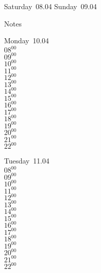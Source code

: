 \documentclass[11pt,a4paper]{book}\usepackage[]{graphicx}\usepackage[]{color}
\begin{document}
\begin{weekendbox}
  Saturday~08.04
  \tcblower
  Sunday~09.04
\end{weekendbox} %
\begin{notebox}
  Notes
\end{notebox}
\clearpage
\begin{headerbox}
\end{headerbox}
\begin{weekdaybox}
  Monday~10.04\\
  { 
  \vfill
  $08^{00}$\\
$09^{00}$\\
$10^{00}$\\
$11^{00}$\\
$12^{00}$\\
$13^{00}$\\
$14^{00}$\\
$15^{00}$\\
$16^{00}$\\
$17^{00}$\\
$18^{00}$\\
$19^{00}$\\
$20^{00}$\\
$21^{00}$\\
$22^{00}$\\
  }
\end{weekdaybox}
\begin{weekdaybox}
  Tuesday~11.04\\
  { 
  \vfill
  $08^{00}$\\
$09^{00}$\\
$10^{00}$\\
$11^{00}$\\
$12^{00}$\\
$13^{00}$\\
$14^{00}$\\
$15^{00}$\\
$16^{00}$\\
$17^{00}$\\
$18^{00}$\\
$19^{00}$\\
$20^{00}$\\
$21^{00}$\\
$22^{00}$\\
  }
\end{weekdaybox}
\end{document}
